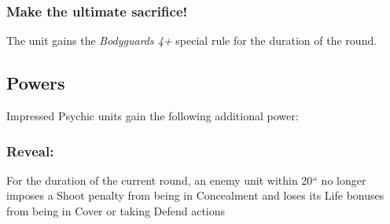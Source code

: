 \subsubsection*{Make the ultimate sacrifice!} The unit gains the \textit{Bodyguards 4+} special rule for the duration of the round.


\subsection*{Powers}

Impressed Psychic units gain the following additional power:

\subsubsection*{Reveal:} For the duration of the current round, an enemy unit within 20`` no longer imposes a Shoot penalty from being in Concealment and loses its Life bonuses from being in Cover or taking Defend actions


\pagebreak



